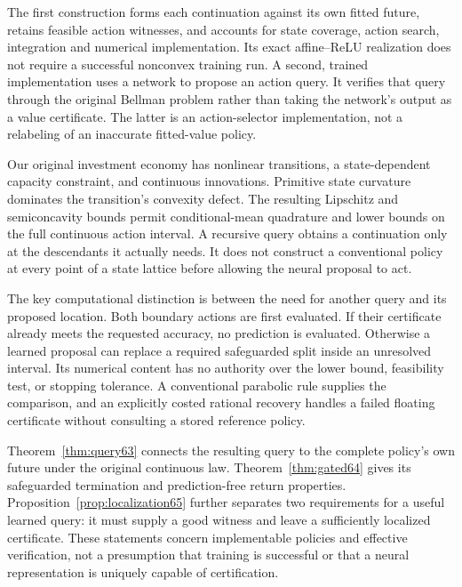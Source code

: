 \documentclass[ecta,nameyear,draft]{econsocart}
\begin{document}
The first construction forms each continuation against its own fitted future, retains feasible action witnesses, and accounts for state coverage, action search, integration and numerical implementation. Its exact affine--ReLU realization does not require a successful nonconvex training run. A second, trained implementation uses a network to propose an action query. It verifies that query through the original Bellman problem rather than taking the network's output as a value certificate. The latter is an action-selector implementation, not a relabeling of an inaccurate fitted-value policy.

Our original investment economy has nonlinear transitions, a state-dependent capacity constraint, and continuous innovations. Primitive state curvature dominates the transition's convexity defect. The resulting Lipschitz and semiconcavity bounds permit conditional-mean quadrature and lower bounds on the full continuous action interval. A recursive query obtains a continuation only at the descendants it actually needs. It does not construct a conventional policy at every point of a state lattice before allowing the neural proposal to act.

The key computational distinction is between the need for another query and its proposed location. Both boundary actions are first evaluated. If their certificate already meets the requested accuracy, no prediction is evaluated. Otherwise a learned proposal can replace a required safeguarded split inside an unresolved interval. Its numerical content has no authority over the lower bound, feasibility test, or stopping tolerance. A conventional parabolic rule supplies the comparison, and an explicitly costed rational recovery handles a failed floating certificate without consulting a stored reference policy.

Theorem~\ref{thm:query63} connects the resulting query to the complete policy's own future under the original continuous law. Theorem~\ref{thm:gated64} gives its safeguarded termination and prediction-free return properties. Proposition~\ref{prop:localization65} further separates two requirements for a useful learned query: it must supply a good witness and leave a sufficiently localized certificate. These statements concern implementable policies and effective verification, not a presumption that training is successful or that a neural representation is uniquely capable of certification.
\end{document}
